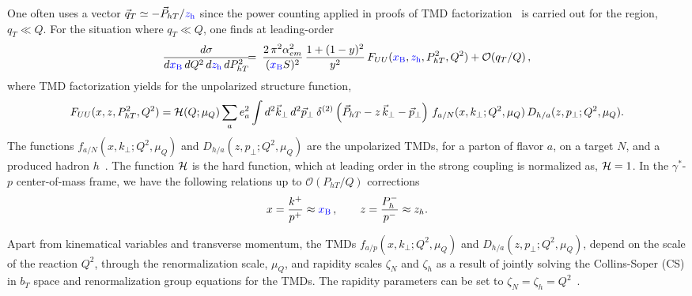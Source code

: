 \documentclass[final,3p,times,onecolumn,sort&compress,hidelinks]{elsarticle}
\newcommand{\xbj}{\ensuremath{{\cbl x_{\rm B}}}}
\newcommand{\zh}{\ensuremath{{\cbl z_{\rm h}}}}
\newcommand\3[1]{\boldsymbol{#1}}
\newcommand{\cbl}{\color{blue}}
\begin{document}
One often uses a vector $\vec{q}_T \simeq -\vec{P}_{hT}/\zh$
 since the power counting applied in proofs of  TMD factorization~\cite{Collins:2011zzd} is carried out for the region, $q_T \ll Q$.
For the situation where $q_{T}\ll Q$, one finds at leading-order~\cite{Bacchetta:2006tn}
\begin{eqnarray}
\frac{d\sigma}
{d\xbj\, dQ^2 \, d\zh \, dP_{hT}^2} &\!\!\!=\!\!\!&
\frac {2 \, \pi^2 \alpha_{em}^2}{(\xbj S)^2} \, \frac{ 1 + (1-y)^2 }{y^2}\,F_{UU}(\xbj,\zh,P_{hT}^2,Q^2) + \mathcal{O}(q_{T}/Q)\, ,
\label{e:dsigma}
\end{eqnarray}
where TMD factorization yields for the unpolarized structure function\cite{Collins:2011zzd},
\begin{equation}
F_{UU}(x,z,P_{hT}^2,Q^2)  = {\cal H} (Q; \mu_Q)\sum_{a} e_a^2 
\int d^2\vec{k}_\perp \, d^2\vec{p}_\perp
\> \delta ^{(2)}\left(\vec{P}_{hT} - z\,\vec{k}_\perp -\vec{p}_\perp \right)\,
f_{a/N} (x, k_{\perp}; Q^2, \mu_Q) \, D_{h/a}(z, p_{\perp}; Q^2, \mu_Q) .
\label{e:FUU} 
\end{equation}
The functions $f_{a/N} (x, k_{\perp}; Q^2, \mu_Q)$ and $D_{h/a}(z, p_{\perp}; Q^2, \mu_Q)$ are the unpolarized  TMDs,  for a parton of flavor
$a$, on a  target $N$, and a produced hadron $h$~\cite{Bacchetta:2006tn,Collins:2011zzd}.  The function ${\cal H}$ is the  hard function, which at leading order in the strong coupling
is normalized as, ${\cal H} = 1$.  In the $\gamma^*$-$p$ center-of-mass frame, we have the following relations up to $\mathcal{O}(P_{hT}/Q)$
corrections~\cite{Bacchetta:2006tn}
\begin{equation}
  x=\frac{k^+}{p^+}\approx \xbj\,, \quad\quad z=\frac{P_h^-}{p^-}\approx z_h.
  \label{e:LT_relations}
\end{equation}







 Apart from kinematical variables and transverse momentum, the TMDs  $f_{a/p} (x, k_{\perp}; Q^2, \mu_Q)$ and $D_{h/a}(z, p_{\perp}; Q^2, \mu_Q)$, 
depend on the scale of the reaction $Q^2$,  through  the renormalization scale, $\mu_Q$, and  rapidity scales  $\zeta_N$ and $\zeta_h$ as a result of  jointly solving the Collins-Soper (CS) in $b_T$ space  and renormalization group equations for the TMDs.  The rapidity parameters can be set to $\zeta_N=\zeta_h=Q^2$~\cite{Collins:2011zzd,Collins:2014jpa}.
\end{document}

